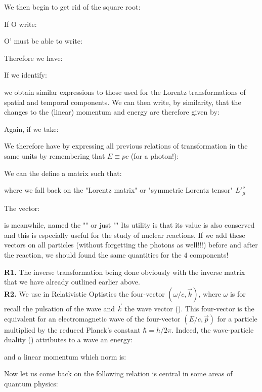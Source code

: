 	We then begin to get rid of the square root:
	
	If O write:
	
	O' must be able to write:
	
	Therefore we have:
	
	If we identify:
	
	we obtain similar expressions to those used for the Lorentz transformations of spatial and temporal components. We can then write, by similarity, that the changes to the (linear) momentum and energy are therefore given by:
	
	Again, if we take:
	

	We therefore have by expressing all previous relations of transformation in the same units by remembering that $E\equiv pc$ (for a photon!):
	
	We can the define a matrix such that:
	
	where we fall back on the "Lorentz matrix" or "symmetric Lorentz tensor" ${L'}_\mu^\nu$

	The vector:
	
	is meanwhile, named the "" or just "" Its utility is that its value is also conserved and this is especially useful for the study of nuclear reactions. If we add these vectors on all particles (without forgetting the photons as well!!!) before and after the reaction, we should found the same quantities for the $4$ components!
	\begin{tcolorbox}[title=Remarks,colframe=black,arc=10pt]
	\textbf{R1.} The inverse transformation being done obviously with the inverse matrix that we have already outlined earlier above.\\
	
	\textbf{R2.} We use in Relativistic Optistics the four-vector $(\omega/c,\vec{k})$, where $\omega$ is for recall the pulsation of the wave and $\vec{k}$ the wave vector (). This four-vector is the equivalent for an electromagnetic wave of the four-vector $(E/c,\vec{p})$ for a particle multiplied by the reduced Planck's constant $\hbar=h/2\pi$. Indeed, the wave-particle duality () attributes to a wave an energy:
	
	and a linear momentum which norm is:
	
	\end{tcolorbox}
	Now let us come back on the following relation is central in some areas of quantum physics:
	
